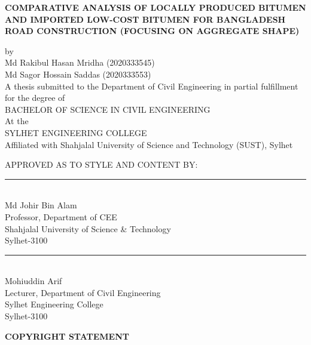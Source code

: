 \documentclass[12pt,a4paper]{article}
\begin{document}
\begin{center}
{\large \textbf{\MakeUppercase{Comparative Analysis of Locally Produced Bitumen and Imported Low-Cost Bitumen for Bangladesh Road Construction (Focusing on Aggregate Shape)}}}\par
\vspace{1cm}
by\\
\vspace{1cm}
Md Rakibul Hasan Mridha (2020333545)\\
Md Sagor Hossain Saddas (2020333553)\\
\vspace{1cm}
A thesis submitted to the Department of Civil Engineering in partial fulfillment for the degree of\\
BACHELOR OF SCIENCE IN CIVIL ENGINEERING\\
\vspace{0.5cm}
At the\\
SYLHET ENGINEERING COLLEGE\\
Affiliated with Shahjalal University of Science and Technology (SUST), Sylhet\\
\end{center}

\vspace{1.5cm}
\noindent APPROVED AS TO STYLE AND CONTENT BY:

\vspace{2.5cm}

\noindent
\begin{minipage}[t]{0.48\textwidth}
    \rule{2.5in}{0.5pt}\\
    Md Johir Bin Alam\\
    Professor, Department of CEE\\
    Shahjalal University of Science \& Technology\\
    Sylhet-3100
\end{minipage}
\hfill
\begin{minipage}[t]{0.48\textwidth}
    \rule{2.5in}{0.5pt}\\
    Mohiuddin Arif\\
    Lecturer, Department of Civil Engineering\\
    Sylhet Engineering College\\
    Sylhet-3100
\end{minipage}

\newpage
{}
{}

\begin{center}
    \textbf{\Large COPYRIGHT STATEMENT}
\end{center}
\end{document}
